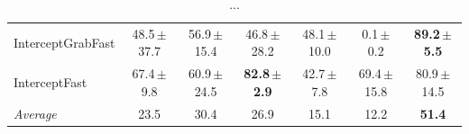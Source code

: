 \begin{table}[t]
\begin{tabular}{lcccccc}
InterceptGrabFast & 48.5\,{\scriptsize$\pm$37.7} & 56.9\,{\scriptsize$\pm$15.4} & 46.8\,{\scriptsize$\pm$28.2} & 48.1\,{\scriptsize$\pm$10.0} & 0.1\,{\scriptsize$\pm$0.2} & \textbf{89.2\,{\scriptsize$\pm$5.5}} \\
InterceptFast & 67.4\,{\scriptsize$\pm$9.8} & 60.9\,{\scriptsize$\pm$24.5} & \textbf{82.8\,{\scriptsize$\pm$2.9}} & 42.7\,{\scriptsize$\pm$7.8} & 69.4\,{\scriptsize$\pm$15.8} & 80.9\,{\scriptsize$\pm$14.5} \\
\midrule
\textit{Average} & 23.5 & 30.4 & 26.9 & 15.1 & 12.2 & \textbf{51.4} \\
\bottomrule
\end{tabular}
\caption{...}
\label{tab:main}
\end{table}
